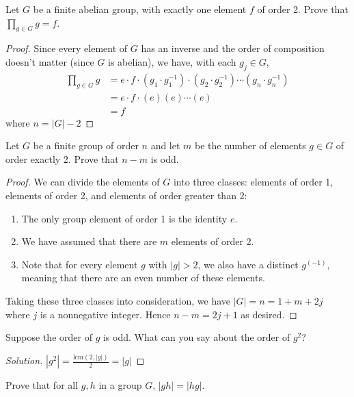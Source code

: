 \documentclass[12pt]{article}
\newenvironment{problem}[2][Problem]{\begin{trivlist}
\item[\hskip \labelsep {\bfseries #1}\hskip \labelsep {\bfseries #2.}]}{\end{trivlist}}
\newcommand{\lcm}[1]{\text{lcm}(#1)}
\newenvironment{solution}
  {\renewcommand\qedsymbol{$\blacksquare$}\begin{proof}[Solution]}
{\end{proof}}
\begin{document}
\begin{problem}{1.8}
  Let $G$ be a finite abelian group, with exactly one element $f$ of order 2.
  Prove that $\prod_{g\in G} g = f$.
\end{problem}
\begin{proof}
  Since every element of $G$ has an inverse and the order of composition
  doesn't matter (since $G$ is abelian), we have, with each $g_j \in G$,
  \begin{align*}
    \prod_{g\in G} g &= e\cdot f\cdot 
    (g_1\cdot g_1^{-1})\cdot (g_2\cdot g_2^{-1})\cdots(g_n\cdot g_n^{-1})\\
    &= e\cdot f\cdot (e)(e)\cdots(e)\\
    &= f
  \end{align*}
  where $n = |G| - 2$
\end{proof}
\begin{problem}{1.9}
  Let $G$ be a finite group of order $n$ and let $m$ be the number of elements
  $g\in G$ of order exactly 2. Prove that $n-m$ is odd.
\end{problem}
\begin{proof}
  We can divide the elements of $G$ into three classes: elements of order 1,
  elements of order 2, and elements of order greater than 2:
  \begin{enumerate}
    \item The only group element of order 1 is the identity $e$.
    \item We have assumed that there are $m$ elements of order 2.
    \item Note that for every element $g$ with $|g|>2$, we also have a distinct
      $g^(-1)$, meaning that there are an even number of these elements.
  \end{enumerate}
  Taking these three classes into consideration, we have 
  $|G| = n = 1 + m + 2j$ where $j$ is a nonnegative integer. Hence
  $n-m=2j+1$ as desired.
\end{proof}
\begin{problem}{1.10}
  Suppose the order of $g$ is odd. What can you say about the order of $g^2$?
\end{problem}
\begin{solution}
  $|g^2| = \frac{\lcm{2,|g|}}{2}=|g|$
\end{solution}
\begin{problem}{1.11}
  Prove that for all $g,h$ in a group $G$, $|gh| = |hg|$.
\end{problem}
\end{document}
